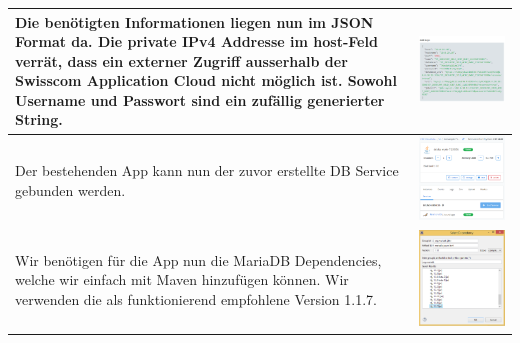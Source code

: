 \begin{longtable}{| p{5cm} | p{11cm} |}
 \\ \hline 
Die benötigten Informationen liegen nun im JSON Format da. Die private IPv4 Addresse im host-Feld verrät, dass ein externer Zugriff ausserhalb der Swisscom Application Cloud nicht möglich ist. Sowohl Username und Passwort sind ein zufällig generierter String.
&\includegraphics[width=0.65\columnwidth, valign=T]{images/mariadb/4.png}
 \\ \hline
Der bestehenden App kann nun der zuvor erstellte DB Service gebunden werden.
&\includegraphics[width=0.65\columnwidth, valign=T]{images/mariadb/5.png}
\\ \hline 
Wir benötigen für die App nun die MariaDB Dependencies, welche wir einfach mit Maven hinzufügen können. Wir verwenden die als funktionierend empfohlene Version 1.1.7.
&\includegraphics[width=0.65\columnwidth, valign=T]{images/mariadb/6.png}

\end{longtable}
